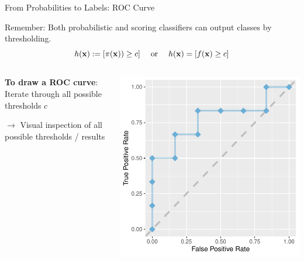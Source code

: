 \documentclass[11pt,compress,t,notes=noshow, xcolor=table]{beamer}
\newenvironment{knitrout}{}{} %
\begin{document}
\begin{vbframe}{From Probabilities to Labels: ROC Curve}

Remember: Both probabilistic and scoring classifiers can output classes by thresholding.\\
$$h(\mathbf{x}):= [\pi(\mathbf{x})) \ge c] \quad \text{ or } \quad h(\mathbf{x}) = [f(\mathbf{x}) \ge c]$$

\begin{columns}
\begin{column}{0.45\textwidth}

\textbf{To draw a ROC curve}:\\

Iterate through all possible thresholds $c$

\lz


$\rightarrow$ Visual inspection of all possible thresholds / results

\end{column}
\begin{column}{0.45\textwidth}

\begin{knitrout}\scriptsize
{}\color{fgcolor}

{\centering \includegraphics[width=\textwidth]{figure/eval_mclass_roc_sp_4}

}



\end{knitrout}


\end{column}
\end{columns}

\end{vbframe}
\end{document}

